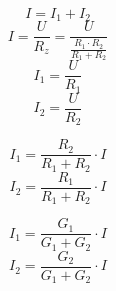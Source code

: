 \begin{equation}
I=I_1+I_2
\end{equation}
\begin{equation}
I=\frac{U}{R_z}=\frac{U}{\frac{R_1 \cdot R_2}{R_1+R_2}}
\end{equation}
\begin{equation}
I_1=\frac{U}{R_1}
\end{equation}
\begin{equation}
I_2=\frac{U}{R_2}
\end{equation}

\begin{equation}
I_1=\frac{R_2}{R_1+R_2} \cdot I
\end{equation}
\begin{equation}
I_2=\frac{R_1}{R_1+R_2} \cdot I
\end{equation}

\begin{equation}
I_1=\frac{G_1}{G_1+G_2} \cdot I
\end{equation}
\begin{equation}
I_2=\frac{G_2}{G_1+G_2} \cdot I
\end{equation}